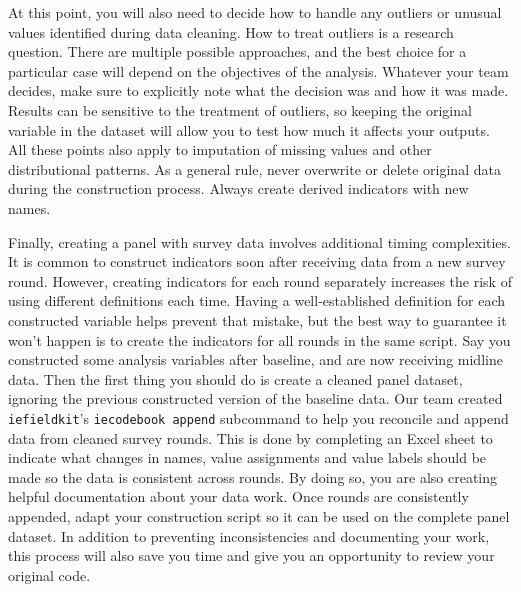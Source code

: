 At this point, you will also need to decide
how to handle any outliers or unusual values identified during data cleaning.
How to treat outliers is a research question.
There are multiple possible approaches,
and the best choice for a particular case
will depend on the objectives of the analysis.
Whatever your team decides, make sure to explicitly note
what the decision was and how it was made.
Results can be sensitive to the treatment of outliers,
so keeping the original variable in the dataset
will allow you to test how much it affects your outputs.
All these points also apply to imputation of missing values and other distributional patterns.
As a general rule, never overwrite or delete original data during the construction process.
Always create derived indicators with new names.

Finally, creating a panel with survey data involves additional timing complexities.
It is common to construct indicators soon after receiving data from a new survey round.
However, creating indicators for each round separately increases the risk of using different definitions each time.
Having a well-established definition for each constructed variable helps prevent that mistake,
but the best way to guarantee it won't happen is to create the indicators for all rounds in the same script.
Say you constructed some analysis variables after baseline, and are now receiving midline data.
Then the first thing you should do is create a cleaned panel dataset,
ignoring the previous constructed version of the baseline data.
Our team created \texttt{iefieldkit}'s \texttt{iecodebook append} subcommand
to help you reconcile and append data from cleaned survey rounds.
This is done by completing an Excel sheet to indicate what changes in
names, value assignments and value labels should be made so the data is consistent across rounds.
By doing so, you are also creating helpful documentation about your data work.
Once rounds are consistently appended,
adapt your construction script so it can be used on the complete panel dataset.
In addition to preventing inconsistencies and documenting your work,
this process will also save you time and give you an opportunity to review your original code.


